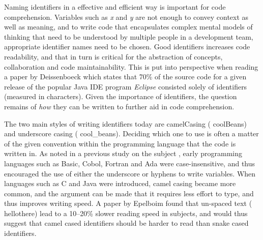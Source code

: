 \iffalse
\begin{itemize}
	\item Identifier names are important
	\item We have two identifier styles
	\item Some history 
	\item Two other studies
	\item Some background on them
	\item Reference all terms introduced
\end{itemize}
\fi

Naming identifiers in a effective and efficient way is important for code comprehension. Variables such as \textit{x} and \textit{y} are not enough to convey context as well as meaning, and to write code that encapsulates complex mental models of thinking that need to be understood by multiple people in a development team, appropriate identifier names need to be chosen\cite{naming-and-code-quality, code-quality-metric, identifier-study}. Good identifiers increases code readability, and that in turn is critical for the abstraction of concepts, collaboration and code maintainability\cite{readability-maintenance, identifier-study}. This is put into perspective when reading a paper by Deissenboeck \etal{} \cite{Concise-Naming} which states that 70\% of the source code for a given release of the popular Java IDE program \textit{Eclipse} consisted solely of identifiers (measured in characters). Given the importance of identifiers, the question remains of \textit{how} they can be written to further aid in code comprehension.

The two main styles of writing identifiers today are camelCasing (\eg{} coolBeans) and underscore casing (\eg{} cool\_beans). Deciding which one to use is often a matter of the given convention within the programming language that the code is written in. As noted in a previous study on the subject \cite{eye-tracking-study}, early programming languages such as Basic, Cobol, Fortran and Ada were case-insensitive, and thus encouraged the use of either the underscore or hyphens to write variables. When languages such as C and Java were introduced, camel casing became more common, and the argument can be made that it requires less effort to type, and thus improves writing speed. A paper by Epelboim \etal{} \cite{Fillers-in-text} found that un-spaced text (\ie{} hellothere) lead to a 10--20\% slower reading speed in subjects, and would thus suggest that camel cased identifiers should be harder to read than snake cased identifiers.


